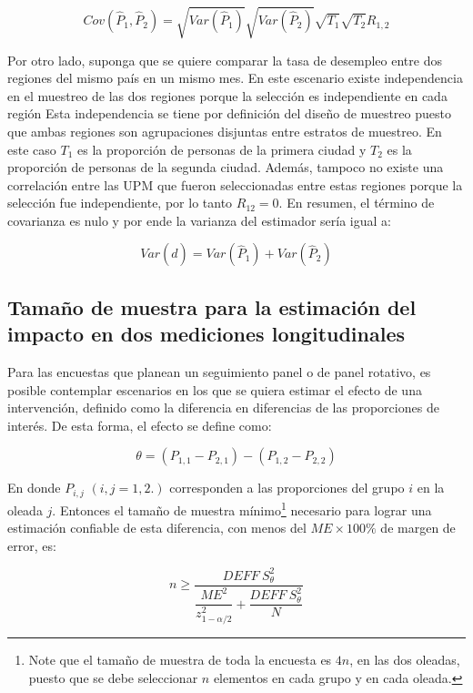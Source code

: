 \documentclass[
  12pt,
  spanish,
]{book}
\begin{document}
\[
Cov(\hat{P}_1, \hat{P}_2) = \sqrt{Var(\hat{P}_1)}\sqrt{Var(\hat{P}_2)}\sqrt{T_1}\sqrt{T_2}R_{1,2}
\]

Por otro lado, suponga que se quiere comparar la tasa de desempleo entre dos regiones del mismo país en un mismo mes. En este escenario existe independencia en el muestreo de las dos regiones porque la selección es independiente en cada región Esta independencia se tiene por definición del diseño de muestreo puesto que ambas regiones son agrupaciones disjuntas entre estratos de muestreo. En este caso \(T_1\) es la proporción de personas de la primera ciudad y \(T_2\) es la proporción de personas de la segunda ciudad. Además, tampoco no existe una correlación entre las UPM que fueron seleccionadas entre estas regiones porque la selección fue independiente, por lo tanto \(R_{12} = 0\). En resumen, el término de covarianza es nulo y por ende la varianza del estimador sería igual a:

\[
Var(\hat{d}) 
= Var(\hat{P}_1) + Var(\hat{P}_2)
\]

\hypertarget{tamauxf1o-de-muestra-para-la-estimaciuxf3n-del-impacto-en-dos-mediciones-longitudinales}{%
\subsection{Tamaño de muestra para la estimación del impacto en dos mediciones longitudinales}\label{tamauxf1o-de-muestra-para-la-estimaciuxf3n-del-impacto-en-dos-mediciones-longitudinales}}

Para las encuestas que planean un seguimiento panel o de panel rotativo, es posible contemplar escenarios en los que se quiera estimar el efecto de una intervención, definido como la diferencia en diferencias de las proporciones de interés. De esta forma, el efecto se define como:

\[
\theta = (P_{1,1}-P_{2,1})-(P_{1,2}-P_{2, 2})
\]

En donde \(P_{i,j}\) \((i, j = 1, 2.)\) corresponden a las proporciones del grupo \(i\) en la oleada \(j\). Entonces el tamaño de muestra mínimo\footnote{Note que el tamaño de muestra de toda la encuesta es \(4n\), en las dos oleadas, puesto que se debe seleccionar \(n\) elementos en cada grupo y en cada oleada.} necesario para lograr una estimación confiable de esta diferencia, con menos del \(ME \times 100\%\) de margen de error, es:

\[
n \geq \dfrac{DEFF \ S^2_{\theta}}{\dfrac{ME^2}{z_{1 - \alpha/2}^2}+\dfrac{DEFF \ S^2_{\theta}}{N}}
\]
\end{document}
